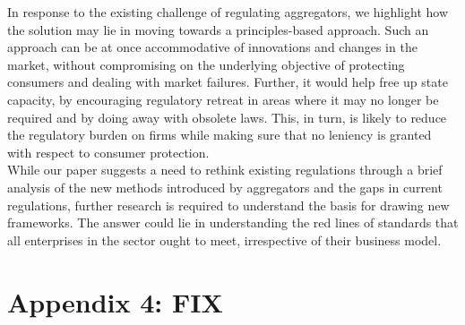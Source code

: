 \documentclass[a4paper, 12pt]{article}
\begin{document}
In response to the existing challenge of regulating aggregators, we highlight how the solution may lie in moving towards a principles-based approach. Such an approach can be at once accommodative of innovations and changes in the market, without compromising on the underlying objective of protecting consumers and dealing with market failures. Further, it would help free up state capacity, by encouraging regulatory retreat in areas where it may no longer be required and by doing away with obsolete laws. This, in turn, is likely to reduce the regulatory burden on firms while making sure that no leniency is granted with respect to consumer protection. \\

While our paper suggests a need to rethink existing regulations through a brief analysis of the new methods introduced by aggregators and the gaps in current regulations, further research is required to understand the basis for drawing new frameworks. The answer could lie in understanding the red lines of standards that all enterprises in the sector ought to meet, irrespective of their business model.\\

               
         

	\printbibliography[title={Bibliography}]
	\newpage

  \section*{Appendix 4: FIX}
\end{document}

